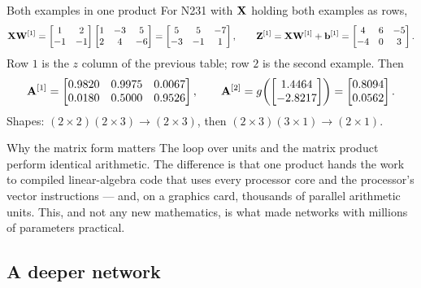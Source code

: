\begin{workedexample}{Both examples in one product}
For N231 with $\mathbf{X}$ holding both examples as rows,
\[
  \mathbf{X}\mathbf{W}^{[1]} = \begin{bmatrix}1&2\\-1&-1\end{bmatrix}
                \begin{bmatrix}1&-3&5\\2&4&-6\end{bmatrix}
              = \begin{bmatrix}5&5&-7\\-3&-1&1\end{bmatrix},
  \qquad
  \mathbf{Z}^{[1]} = \mathbf{X}\mathbf{W}^{[1]} + \mathbf{b}^{[1]}
    = \begin{bmatrix}4&6&-5\\-4&0&3\end{bmatrix}.
\]
Row $1$ is the $z$ column of the previous table; row $2$ is the second example.
Then
\[
  \mathbf{A}^{[1]} = \begin{bmatrix}0.9820&0.9975&0.0067\\0.0180&0.5000&0.9526\end{bmatrix},
  \qquad
  \mathbf{A}^{[2]} = g\!\left(\begin{bmatrix}1.4464\\-2.8217\end{bmatrix}\right)
                   = \begin{bmatrix}0.8094\\0.0562\end{bmatrix}.
\]
Shapes: $(2\times2)(2\times3)\to(2\times3)$, then $(2\times3)(3\times1)\to(2\times1)$.
\end{workedexample}

\begin{keyinsight}{Why the matrix form matters}
The loop over units and the matrix product perform identical arithmetic. The
difference is that one product hands the work to compiled linear-algebra code
that uses every processor core and the processor's vector instructions --- and,
on a graphics card, thousands of parallel arithmetic units. This, and not any
new mathematics, is what made networks with millions of parameters practical.
\end{keyinsight}

\subsection{A deeper network}

